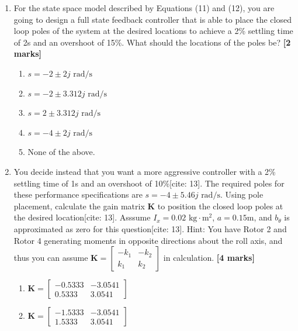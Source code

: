 \documentclass{article}
\begin{document}
\begin{enumerate}[resume]
    \item For the state space model described by Equations (11) and (12), you are going to design a full state feedback controller that is able to place the closed loop poles of the system at the desired locations to achieve a 2\% settling time of 2s and an overshoot of 15\%. What should the locations of the poles be? 
    \textbf{[2 marks]}
    \begin{enumerate}[label=\alph*.]
        \item $s = -2 \pm 2j\text{ rad/s}$
        \item $s = -2 \pm 3.312j\text{ rad/s}$
        \item $s = 2 \pm 3.312j\text{ rad/s}$
        \item $s = -4 \pm 2j\text{ rad/s}$
        \item None of the above.
    \end{enumerate}
    \item You decide instead that you want a more aggressive controller with a 2\% settling time of 1s and an overshoot of 10\%[cite: 13]. The required poles for these performance specifications are $s = -4 \pm 5.46j\text{ rad/s}$. Using pole placement, calculate the gain matrix $\mathbf{K}$ to position the closed loop poles at the desired location[cite: 13]. Asssume $I_x = 0.02\text{ kg}\cdot\text{m}^2$, $a = 0.15\text{m}$, and $b_\theta$ is approximated as zero for this question[cite: 13]. Hint: You have Rotor 2 and Rotor 4 generating moments in opposite directions about the roll axis, and thus you can assume $\mathbf{K} = \begin{bmatrix} -k_1 & -k_2 \\ k_1 & k_2 \end{bmatrix}$ in calculation. \hfill \textbf{[4 marks]}
    
    \begin{enumerate}[label=\alph*.]
        \item $\mathbf{K} = \begin{bmatrix} -0.5333 & -3.0541 \\ 0.5333 & 3.0541 \end{bmatrix}$
        \vspace{2mm}

        \item $\mathbf{K} = \begin{bmatrix} -1.5333 & -3.0541 \\ 1.5333 & 3.0541 \end{bmatrix}$
        \vspace{2mm}


\end{enumerate}
\end{enumerate}
\end{document}
